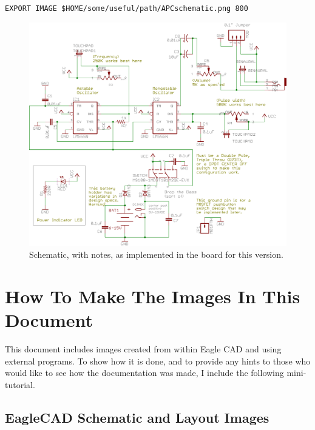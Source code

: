 \documentclass[12pt]{article}
\newcommand{\+}{\item}		%
\newif\ifkey
\begin{document}
\verb|EXPORT IMAGE $HOME/some/useful/path/APCschematic.png 800|

\bigskip

\begin{figure}[hb!]
\begin{center}
\includegraphics[scale=0.9]{APCschembetter.png} %
\end{center}
\caption{Schematic, with notes, as implemented in the board for this version.}
\end{figure}

%
%

\ifkey 

\clearpage
\section{How To Make The Images In This Document}

This document includes images created from within Eagle CAD and using external programs. To show how it is done, and to provide any hints to those who would like to see how the documentation was made, I include the following mini-tutorial.

\subsection{EagleCAD Schematic and Layout Images }
\end{document}

